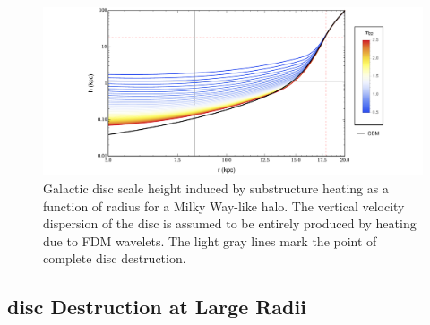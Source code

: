 \documentclass[usenatbib]{mnras}
\begin{document}
\begin{figure}
\includegraphics[width=18cm]{disk_scale_height}
\vspace*{-5mm}
\caption{Galactic disc scale height induced by substructure heating as a function of radius for a Milky Way-like halo. The vertical velocity dispersion of the disc is assumed to be entirely produced by heating due to FDM wavelets. The light gray lines mark the point of complete disc destruction. }
\label{fig:disc_scale_height}
\end{figure}

\subsection{disc Destruction at Large Radii}
\end{document}
